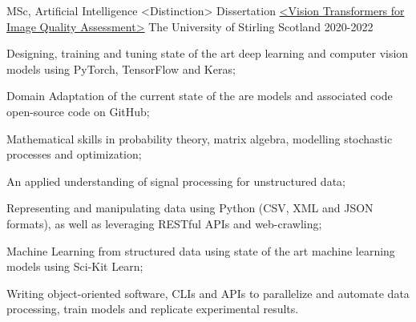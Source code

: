 

\begin{cventries}

  \cventry
    {MSc, Artificial Intelligence <Distinction> \newline Dissertation \href{https://drive.google.com/file/d/19DJmL0QGRAjbEKW7Xk-OBbQMFWtkOZJ9/view?usp=sharing}{<Vision Transformers for Image Quality Assessment>} } %
    {\newline The University of Stirling} %
    {Scotland} %
    {2020-2022} %
    {
      \begin{cvitems} %
        \item{Designing, training and tuning state of the art deep learning and computer vision models using PyTorch, TensorFlow and Keras;}
        \item{Domain Adaptation of the current state of the are models and associated code open-source code on GitHub;}
        \item{Mathematical skills in probability theory, matrix algebra, modelling stochastic processes and optimization;}
        \item{An applied understanding of signal processing for unstructured data;}
        \item{Representing and manipulating data using Python (CSV, XML and JSON formats), as well as leveraging RESTful APIs and web-crawling;}
        \item{Machine Learning from structured data using state of the art machine learning models using Sci-Kit Learn;}
        \item{Writing object-oriented software, CLIs and APIs to parallelize and automate data processing, train models and replicate experimental results.}
      \end{cvitems}
    }
    

\end{cventries}

